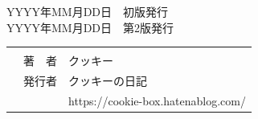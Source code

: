 \documentclass[b5paper,xelatex,ja=standard,10pt]{bxjsarticle}
\begin{document}
\clearpage
\vspace*{16.7cm}

\begin{OKUDUKE}[title={NeurIPS 2021 にみる \, \textbf{\large 最近のニューラル系列モデルへの発見・工夫・理解}}]
YYYY年MM月DD日　初版発行 \\
YYYY年MM月DD日　第2版発行 \\
{
\renewcommand\arraystretch{0.9}
\begin{tabular}{p{4cm}rp{5.9cm}}
 &  &  \\
 & 著　者 & クッキー \\
 & 発行者 & クッキーの日記 \\
 & & https://cookie-box.hatenablog.com/ 
\end{tabular}
}
\end{OKUDUKE}
\thispagestyle{empty}
\end{document}
